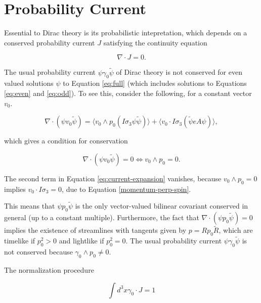 \documentclass{article}
\begin{document}
  \section{Probability Current}\label{probability}

  Essential to Dirac theory is its probabilistic intepretation, which depends on a conserved probability current $J$ satisfying the continuity equation

  \begin{equation}
    \nabla \cdot J = 0.
  \end{equation}

  The usual probability current $\psi \gamma_0 \widetilde \psi$ of Dirac theory is not conserved for even valued solutions $\psi$ to Equation \ref{eq:full} (which includes solutions to Equations \ref{eq:even} and \ref{eq:odd}). To see this, consider the following, for a constant vector $v_0$.

  \begin{equation}
    \nabla \cdot (\psi v_0 \widetilde \psi) = \langle v_0 \wedge p_0 (I \sigma_3 \psi \widetilde \psi) \rangle + \langle v_0 \cdot I \sigma_3 (\widetilde \psi e A \psi) \rangle,\label{eq:current-expansion}
  \end{equation}

  which gives a condition for conservation

  \begin{equation}
    \nabla \cdot (\psi v_0 \widetilde \psi) = 0 \iff v_0 \wedge p_0 = 0.
  \end{equation}

  The second term in Equation \ref{eq:current-expansion} vanishes, because $v_0 \wedge p_0 = 0$ implies $v_0 \cdot I \sigma_3 = 0$, due to Equation \ref{momentum-perp-spin}.

  This means that $\psi p_0 \widetilde \psi$ is the only vector-valued bilinear covariant conserved in general (up to a constant multiple). Furthermore, the fact that $\nabla \cdot (\psi p_0 \widetilde \psi) = 0$ implies the existence of streamlines with tangents given by $p = R p_0 \widetilde R$, which are timelike if $p_0^2 > 0$ and lightlike if $p_0^2 = 0$.\cite{hestenes} The usual probability current $\psi \gamma_0 \widetilde \psi$ is not conserved because $\gamma_0 \wedge p_0 \not= 0$.

  The normalization procedure

  \begin{equation}
    \int d^3x \gamma_0 \cdot J = 1\label{eq:mnormal}
  \end{equation}
\end{document}
